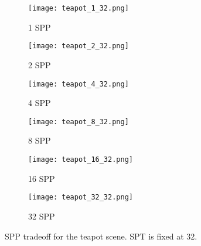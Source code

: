 \begin{figure}[htb]
  \begin{subfigure}{0.49\textwidth}
  \texttt{[image: teapot\_1\_32.png]}
  \caption{1 SPP}
  \end{subfigure}
  \hspace*{\fill} %
  \begin{subfigure}{0.49\textwidth}
  \texttt{[image: teapot\_2\_32.png]}
  \caption{2 SPP}
  \end{subfigure}
  \qquad
  \begin{subfigure}{0.49\textwidth}
  \texttt{[image: teapot\_4\_32.png]}
  \caption{4 SPP}
  \end{subfigure}
  \hspace*{\fill} %
  \begin{subfigure}{0.49\textwidth}
  \texttt{[image: teapot\_8\_32.png]}
  \caption{8 SPP}
  \end{subfigure}
  \qquad
  \begin{subfigure}{0.49\textwidth}
  \texttt{[image: teapot\_16\_32.png]}
  \caption{16 SPP}
  \end{subfigure}
  \hspace*{\fill} %
  \begin{subfigure}{0.49\textwidth}
  \texttt{[image: teapot\_32\_32.png]}
  \caption{32 SPP}
  \end{subfigure}

  \caption{\label{fig:spp_tradeoff_AO}
           SPP tradeoff for the teapot scene. SPT is fixed at 32.
           }
\end{figure}
